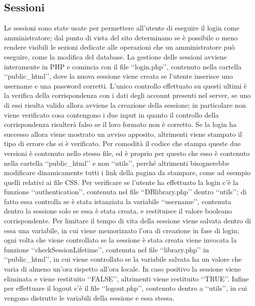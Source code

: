 {	\subsection{Sessioni}{
		Le sessioni sono state usate per permettere all'utente di eseguire il login come amministratore; dal punto di vista del sito determinano se è possibile o meno rendere visibili le sezioni dedicate alle operazioni che un amministratore può eseguire, come la modifica del database. La gestione delle sessioni avviene interamente in PHP e comincia con il file ‘‘login.php’’, contenuto nella cartella ‘‘public_html’’, dove la nuova sessione viene creata se l'utente inserisce uno username e una password corretti. L'unico controllo effettuato su questi ultimi è la verifica della corrispondenza con i dati degli account presenti nel server, se uno di essi risulta valido allora avviene la creazione della sessione; in particolare non viene verificato cosa contengono i due input in quanto il controllo della corrispondenza risulterà falso se il loro formato non è corretto. Se la login ha successo allora viene mostrato un avviso apposito, altrimenti viene stampato il tipo di errore che si è verificato. Per comodità il codice che stampa queste due versioni è contenuto nello stesso file, ed è proprio per questo che esso è contenuto nella cartella ‘‘public_html’’ e non ‘‘utils’’, perché altrimenti bisognerebbe modificare dinamicamente tutti i link della pagina da stampare, come ad esempio quelli relativi ai file CSS.
		Per verificare se l'utente ha effettuato la login c'è la funzione ‘‘authentication’’, contenuta nel file ‘‘DBlibrary.php’’ dentro ‘‘utils’’; di fatto essa controlla se è stata istanziata la variabile ‘‘username’’, contenuta dentro la sessione solo se essa è stata creata, e restituisce il valore booleano corrispondente.
		Per limitare il tempo di vita della sessione viene salvata dentro di essa una variabile, in cui viene memorizzato l'ora di creazione in fase di login; ogni volta che viene controllato se la sessione è stata creata viene invocata la funzione ‘‘checkSessionLifetime’’, contenuta nel file ‘‘library.php’’ in ‘‘public_html’’, in cui viene controllato se la variabile salvata ha un valore che varia di almeno un'ora rispetto all'ora locale. In caso positivo la sessione viene eliminata e viene restituito ‘‘FALSE’’, altrimenti viene restituito ‘‘TRUE’’.
		Infine per effettuare il logout c'è il file ‘‘logout.php’’, contenuto dentro a ‘‘utils’’, in cui vengono distrutte le variabili della sessione e essa stessa.
	}
}